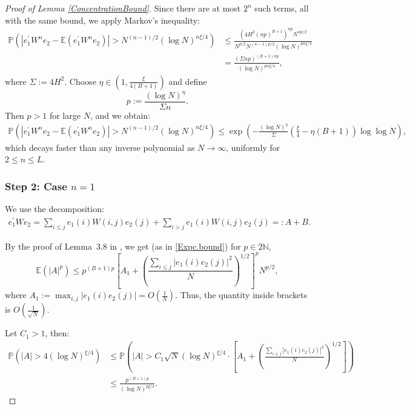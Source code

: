 \documentclass[11pt, reqno]{amsart}
\numberwithin{equation}{section}
\begin{document}
\begin{proof}[Proof of Lemma \ref{ConcentrationBound}]
Since there are at most \( 2^n \) such terms, all with the same bound, we apply Markov's inequality:
\begin{align*}
\mathbb{P}\left( \left| e_1^\prime W^n e_2 - \mathbb{E}(e_1^\prime W^n e_2) \right| > N^{(n-1)/2} (\log N)^{n\xi/4} \right)
&\le \frac{(4H^2 (np)^{B+1})^{np} N^{np/2}}{N^{p/2} N^{(n-1)p/2} (\log N)^{pn\xi/4}} \\
&= \frac{(\Sigma np)^{(B+1)np}}{(\log N)^{pn\xi/4}},
\end{align*}
where \( \Sigma := 4H^2 \). Choose \( \eta \in \left(1, \frac{\xi}{4(B+1)}\right) \) and define
\[
p := \frac{(\log N)^{\eta}}{\Sigma n}.
\]
Then \( p > 1 \) for large \( N \), and we obtain:
\begin{align*}
\mathbb{P}\left( \left| e_1^\prime W^n e_2 - \mathbb{E}(e_1^\prime W^n e_2) \right| > N^{(n-1)/2} (\log N)^{n\xi/4} \right) 
\le \exp\left( - \frac{(\log N)^{\eta}}{\Sigma} \left( \frac{\xi}{4} - \eta(B+1) \right) \log \log N \right),
\end{align*}
which decays faster than any inverse polynomial as \( N \to \infty \), uniformly for \( 2 \le n \le L \).

\subsubsection*{Step 2: Case \( n = 1 \)}

We use the decomposition:
\begin{align}
\label{Baisc}
e_1^\prime W e_2 = \sum_{i \le j} e_1(i) W(i,j) e_2(j) + \sum_{i > j} e_1(i) W(i,j) e_2(j) =: A + B.
\end{align}

By the proof of Lemma~3.8 in \cite{erdHos2013spectral}, we get (as in \eqref{Expc.bound}) for \( p \in 2\mathbb{N} \),
\[
\mathbb{E}(|A|^p) \le p^{(B+1)p} \left[ A_1 + \left( \frac{ \sum_{i \le j} |e_1(i) e_2(j)|^2 }{N} \right)^{1/2} \right]^p N^{p/2},
\]
where \( A_1 := \max_{i,j} |e_1(i) e_2(j)| = O\left( \frac{1}{N} \right) \). Thus, the quantity inside brackets is \( O\left( \frac{1}{\sqrt{N}} \right) \).

Let \( C_1 > 1 \), then:
\begin{align*}
\mathbb{P}(|A| > 4(\log N)^{\xi/4}) 
&\le \mathbb{P}\left( |A| > C_1 \sqrt{N} (\log N)^{\xi/4} \cdot \left[ A_1 + \left( \frac{ \sum_{i \le j} |e_1(i) e_2(j)|^2 }{N} \right)^{1/2} \right] \right) \\
&\le \frac{p^{(B+1)p}}{(\log N)^{p\xi/4}}.
\end{align*}


\end{proof}
\end{document}
